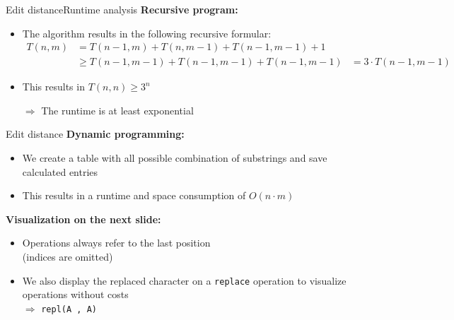 


\begin{frame}{Edit distance}{Runtime analysis}
  \textbf{Recursive program:}
  \begin{itemize}
    \item<2->
      The algorithm results in the following recursive formular:
      \begin{align*}
        T(n, m) &= T(n-1, m) + T(n, m-1) + T(n-1, m-1) + 1\\
        & \geq T(n-1, m-1) + T(n-1, m-1) + T(n-1, m-1)
        & = 3 \cdot T(n-1, m-1)
      \end{align*}
    \item<3->
      This results in {\color{Mittel-Blau}$T(n, n) \geq 3^n$}
    \item[$\Rightarrow$]
      The runtime is at least {\color{Mittel-Blau}exponential}
  \end{itemize}
\end{frame}


\begin{frame}{Edit distance}
  \textbf{Dynamic programming:}
  \begin{itemize}
    \item<2->
      We create a table with all possible combination of substrings and save
      calculated entries
    \item<2->
      This results in a runtime and space consumption of
      {\color{Mittel-Blau}$O(n \cdot m)$}
  \end{itemize}
  \vspace{1em}
  \textbf{Visualization on the next slide:}
  \begin{itemize}
    \item<4->
      Operations always refer to the last position\\
      (indices are omitted)
    \item<5->
      We also display the replaced character on a \texttt{replace} operation
      to visualize operations without costs\\
      $\Rightarrow$ \texttt{\color{Mittel-Blau}repl(\color{Mittel-Gruen}A%
        \color{Mittel-Blau}, \color{Mittel-Gruen}A\color{Mittel-Blau})}
  \end{itemize}
\end{frame}

